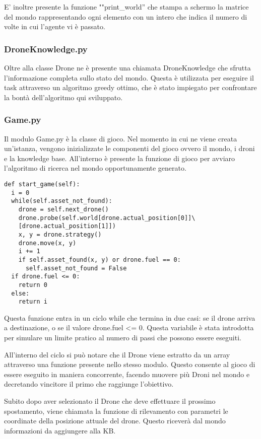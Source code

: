 E' inoltre presente la funzione ""print\_world'' che stampa a schermo la matrice del mondo rappresentando ogni elemento con un intero che indica il numero di volte in cui l'agente vi è passato.

\subsubsection{DroneKnowledge.py}
Oltre alla classe Drone ne è presente una chiamata DroneKnowledge che sfrutta l'informazione completa sullo stato del mondo. Questa è utilizzata per eseguire il task attraverso un algoritmo greedy ottimo, che è stato impiegato per confrontare la bontà dell'algoritmo qui sviluppato.

\subsubsection{Game.py}
Il modulo Game.py è la classe di gioco. Nel momento in cui ne viene creata un'istanza, vengono inizializzate le componenti del gioco ovvero il mondo, i droni e la knowledge base. All'interno è presente la funzione di gioco per avviaro l'algoritmo di ricerca nel mondo opportunamente generato.
\begin{verbatim}
def start_game(self):
  i = 0
  while(self.asset_not_found):
    drone = self.next_drone()
    drone.probe(self.world[drone.actual_position[0]]\
    [drone.actual_position[1]])
    x, y = drone.strategy()
    drone.move(x, y)
    i += 1
    if self.asset_found(x, y) or drone.fuel == 0:
      self.asset_not_found = False
  if drone.fuel <= 0:
    return 0
  else:
    return i
\end{verbatim}
Questa funzione entra in un ciclo while che termina in due casi: se il drone arriva a destinazione, o se il valore drone.fuel <= 0. Questa variabile è stata introdotta per simulare un limite pratico al numero di passi che possono essere eseguiti. 

All'interno del ciclo si può notare che il Drone viene estratto da un array attraverso una funzione presente nello stesso modulo. Questo consente al gioco di essere eseguito in maniera concorrente, facendo muovere più Droni nel mondo e decretando vincitore il primo che raggiunge l'obiettivo.

Subito dopo aver selezionato il Drone che deve effettuare il prossimo spostamento, viene chiamata la funzione di rilevamento con parametri le coordinate della posizione attuale del drone. Questo riceverà dal mondo informazioni da aggiungere alla KB. 

